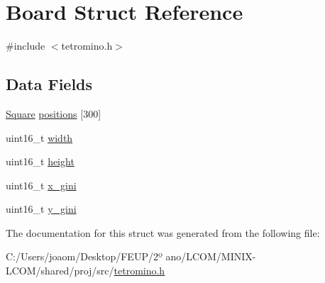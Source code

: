 \hypertarget{struct_board}{}\section{Board Struct Reference}
\label{struct_board}


{\ttfamily \#include $<$tetromino.\+h$>$}

\subsection*{Data Fields}
\begin{DoxyCompactItemize}
\item 
\mbox{\hyperlink{struct_square}{Square}} \mbox{\hyperlink{group__tetramino_ga4eedd16e00191125d9b7c28eed681ef4}{positions}} \mbox{[}300\mbox{]}
\item 
uint16\+\_\+t \mbox{\hyperlink{group__tetramino_gad0eab1042455a2067c812ab8071d5376}{width}}
\item 
uint16\+\_\+t \mbox{\hyperlink{group__tetramino_ga81c9f8d0b8c3b49d770be14dbe9f0d37}{height}}
\item 
uint16\+\_\+t \mbox{\hyperlink{group__tetramino_ga92d26140c764e05f62f37639fb87fc88}{x\+\_\+gini}}
\item 
uint16\+\_\+t \mbox{\hyperlink{group__tetramino_gafccac8a8a85671bdaf9a927aaefb0b05}{y\+\_\+gini}}
\end{DoxyCompactItemize}


The documentation for this struct was generated from the following file\+:\begin{DoxyCompactItemize}
\item 
C\+:/\+Users/joaom/\+Desktop/\+F\+E\+U\+P/2º ano/\+L\+C\+O\+M/\+M\+I\+N\+I\+X-\/\+L\+C\+O\+M/shared/proj/src/\mbox{\hyperlink{tetromino_8h}{tetromino.\+h}}\end{DoxyCompactItemize}
